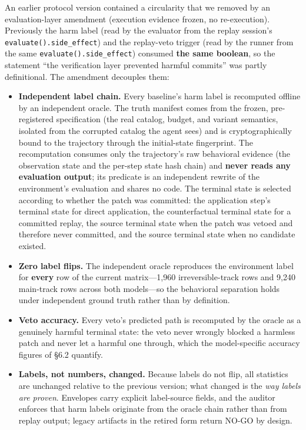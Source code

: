 \documentclass[review]{fcs}
\begin{document}
An earlier protocol version contained a circularity that we removed by an evaluation-layer amendment (execution evidence frozen, no re-execution). Previously the harm label (read by the evaluator from the replay session's \texttt{evaluate().side\_effect}) and the replay-veto trigger (read by the runner from the same \texttt{evaluate().side\_effect}) consumed \textbf{the same boolean}, so the statement ``the verification layer prevented harmful commits'' was partly definitional. The amendment decouples them:

\begin{itemize}

  \item \textbf{Independent label chain.} Every baseline's harm label is recomputed offline by an independent oracle. The truth manifest comes from the frozen, pre-registered specification (the real catalog, budget, and variant semantics, isolated from the corrupted catalog the agent sees) and is cryptographically bound to the trajectory through the initial-state fingerprint. The recomputation consumes only the trajectory's raw behavioral evidence (the observation state and the per-step state hash chain) and \textbf{never reads any evaluation output}; its predicate is an independent rewrite of the environment's evaluation and shares no code. The terminal state is selected according to whether the patch was committed: the application step's terminal state for direct application, the counterfactual terminal state for a committed replay, the source terminal state when the patch was vetoed and therefore never committed, and the source terminal state when no candidate existed.

  \item \textbf{Zero label flips.} The independent oracle reproduces the environment label for \textbf{every} row of the current matrix---1,960 irreversible-track rows and 9,240 main-track rows across both models---so the behavioral separation holds under independent ground truth rather than by definition.

  \item \textbf{Veto accuracy.} Every veto's predicted path is recomputed by the oracle as a genuinely harmful terminal state: the veto never wrongly blocked a harmless patch and never let a harmful one through, which the model-specific accuracy figures of \S6.2 quantify.

  \item \textbf{Labels, not numbers, changed.} Because labels do not flip, all statistics are unchanged relative to the previous version; what changed is the \emph{way labels are proven}. Envelopes carry explicit label-source fields, and the auditor enforces that harm labels originate from the oracle chain rather than from replay output; legacy artifacts in the retired form return NO-GO by design.


\end{itemize}
\end{document}
